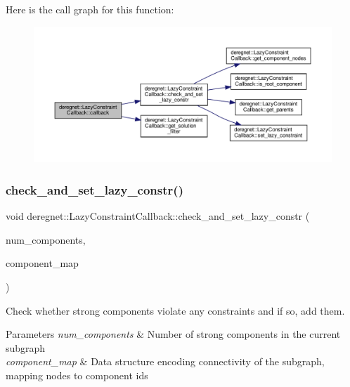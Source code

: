 Here is the call graph for this function\+:\nopagebreak
\begin{figure}[H]
\begin{center}
\leavevmode
\includegraphics[width=350pt]{classderegnet_1_1LazyConstraintCallback_ae6cde79cca11b944d25f1533727fd85b_cgraph}
\end{center}
\end{figure}
\mbox{\label{classderegnet_1_1LazyConstraintCallback_a02eb39d4ea843597aa7c3382f17af874}} 
\subsubsection{\texorpdfstring{check\+\_\+and\+\_\+set\+\_\+lazy\+\_\+constr()}{check\_and\_set\_lazy\_constr()}}
{\footnotesize\ttfamily void deregnet\+::\+Lazy\+Constraint\+Callback\+::check\+\_\+and\+\_\+set\+\_\+lazy\+\_\+constr (\begin{DoxyParamCaption}\item[{const int}]{num\+\_\+components,  }\item[{const Induced\+Subgraph\+::\+Node\+Map$<$ int $>$ \&}]{component\+\_\+map }\end{DoxyParamCaption})\hspace{0.3cm}{\ttfamily [private]}}



Check whether strong components violate any constraints and if so, add them. 


\begin{DoxyParams}{Parameters}
{\em num\+\_\+components} & Number of strong components in the current subgraph \\
\hline
{\em component\+\_\+map} & Data structure encoding connectivity of the subgraph, mapping nodes to component id\textquotesingle{}s \\
\hline
\end{DoxyParams}


